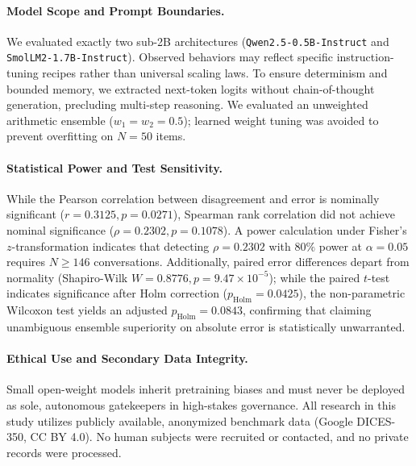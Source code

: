 \paragraph{Model Scope and Prompt Boundaries.}
We evaluated exactly two sub-2B architectures (\texttt{Qwen2.5-0.5B-Instruct} and \texttt{SmolLM2-1.7B-Instruct}). Observed behaviors may reflect specific instruction-tuning recipes rather than universal scaling laws. To ensure determinism and bounded memory, we extracted next-token logits without chain-of-thought generation, precluding multi-step reasoning. We evaluated an unweighted arithmetic ensemble ($w_1 = w_2 = 0.5$); learned weight tuning was avoided to prevent overfitting on $N=50$ items.

\paragraph{Statistical Power and Test Sensitivity.}
While the Pearson correlation between disagreement and error is nominally significant ($r=0.3125, p=0.0271$), Spearman rank correlation did not achieve nominal significance ($\rho=0.2302, p=0.1078$). A power calculation under Fisher's $z$-transformation indicates that detecting $\rho=0.2302$ with $80\%$ power at $\alpha=0.05$ requires $N \ge 146$ conversations. Additionally, paired error differences depart from normality (Shapiro-Wilk $W=0.8776, p=9.47\times 10^{-5}$); while the paired $t$-test indicates significance after Holm correction ($p_{\text{Holm}}=0.0425$), the non-parametric Wilcoxon test yields an adjusted $p_{\text{Holm}}=0.0843$, confirming that claiming unambiguous ensemble superiority on absolute error is statistically unwarranted.

\paragraph{Ethical Use and Secondary Data Integrity.}
Small open-weight models inherit pretraining biases and must never be deployed as sole, autonomous gatekeepers in high-stakes governance. All research in this study utilizes publicly available, anonymized benchmark data (Google DICES-350, CC BY 4.0). No human subjects were recruited or contacted, and no private records were processed.
